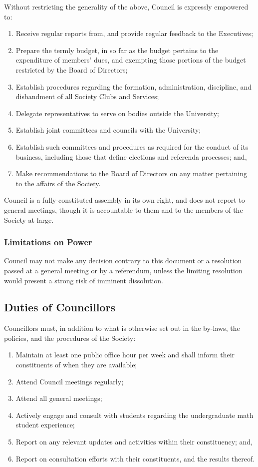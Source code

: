 Without restricting the generality of the above, Council is expressly
empowered to:
\begin{enumerate}
    \item Receive regular reports from, and provide regular feedback to the
        Executives;
    \item Prepare the termly budget, in so far as the budget pertains to the 
        expenditure of members’ dues, and
        exempting those portions of the budget restricted by the Board of 
        Directors;
    \item Establish procedures regarding the formation, administration,
        discipline, and disbandment of all Society Clubs and Services;
    \item Delegate representatives to serve on bodies outside the University;
    \item Establish joint committees and councils with the University;
    \item Establish such committees and procedures as required for the conduct
        of its business, including those that define elections and referenda
        processes; and,
    \item Make recommendations to the Board of Directors on any matter
        pertaining to the affairs of the Society.
\end{enumerate}

Council is a fully-constituted assembly in its own right,
and does not report to general meetings, though it is accountable to them and
to the members of the Society at large.

\subsubsection{Limitations on Power}
Council may not make any decision contrary to this document or a
resolution passed at a general meeting or by a referendum, unless the limiting
resolution would present a strong risk of imminent dissolution.

\subsection{Duties of Councillors}

Councillors must, in addition to what is otherwise set out in the by-laws,
the policies, and the procedures of the Society:
\begin{enumerate}
    \item Maintain at least one public office hour per week and shall inform
        their constituents of when they are available; 
    \item Attend Council meetings regularly; 
    \item Attend all general meetings;
    \item Actively engage and consult with students regarding the undergraduate
        math student experience;
    \item Report on any relevant updates and activities within their
        constituency; and,
    \item Report on consultation efforts with their constituents, and the
        results thereof.
\end{enumerate}

